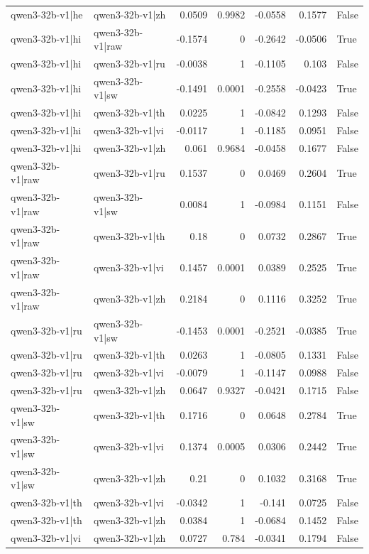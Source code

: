 \begin{table}
\begin{tabular}{l l r r r r l}
qwen3-32b-v1|he & qwen3-32b-v1|zh & 0.0509 & 0.9982 & -0.0558 & 0.1577 & False \\
qwen3-32b-v1|hi & qwen3-32b-v1|raw & -0.1574 & 0 & -0.2642 & -0.0506 & True \\
qwen3-32b-v1|hi & qwen3-32b-v1|ru & -0.0038 & 1 & -0.1105 & 0.103 & False \\
qwen3-32b-v1|hi & qwen3-32b-v1|sw & -0.1491 & 0.0001 & -0.2558 & -0.0423 & True \\
qwen3-32b-v1|hi & qwen3-32b-v1|th & 0.0225 & 1 & -0.0842 & 0.1293 & False \\
qwen3-32b-v1|hi & qwen3-32b-v1|vi & -0.0117 & 1 & -0.1185 & 0.0951 & False \\
qwen3-32b-v1|hi & qwen3-32b-v1|zh & 0.061 & 0.9684 & -0.0458 & 0.1677 & False \\
qwen3-32b-v1|raw & qwen3-32b-v1|ru & 0.1537 & 0 & 0.0469 & 0.2604 & True \\
qwen3-32b-v1|raw & qwen3-32b-v1|sw & 0.0084 & 1 & -0.0984 & 0.1151 & False \\
qwen3-32b-v1|raw & qwen3-32b-v1|th & 0.18 & 0 & 0.0732 & 0.2867 & True \\
qwen3-32b-v1|raw & qwen3-32b-v1|vi & 0.1457 & 0.0001 & 0.0389 & 0.2525 & True \\
qwen3-32b-v1|raw & qwen3-32b-v1|zh & 0.2184 & 0 & 0.1116 & 0.3252 & True \\
qwen3-32b-v1|ru & qwen3-32b-v1|sw & -0.1453 & 0.0001 & -0.2521 & -0.0385 & True \\
qwen3-32b-v1|ru & qwen3-32b-v1|th & 0.0263 & 1 & -0.0805 & 0.1331 & False \\
qwen3-32b-v1|ru & qwen3-32b-v1|vi & -0.0079 & 1 & -0.1147 & 0.0988 & False \\
qwen3-32b-v1|ru & qwen3-32b-v1|zh & 0.0647 & 0.9327 & -0.0421 & 0.1715 & False \\
qwen3-32b-v1|sw & qwen3-32b-v1|th & 0.1716 & 0 & 0.0648 & 0.2784 & True \\
qwen3-32b-v1|sw & qwen3-32b-v1|vi & 0.1374 & 0.0005 & 0.0306 & 0.2442 & True \\
qwen3-32b-v1|sw & qwen3-32b-v1|zh & 0.21 & 0 & 0.1032 & 0.3168 & True \\
qwen3-32b-v1|th & qwen3-32b-v1|vi & -0.0342 & 1 & -0.141 & 0.0725 & False \\
qwen3-32b-v1|th & qwen3-32b-v1|zh & 0.0384 & 1 & -0.0684 & 0.1452 & False \\
qwen3-32b-v1|vi & qwen3-32b-v1|zh & 0.0727 & 0.784 & -0.0341 & 0.1794 & False \\
\bottomrule
\end{tabular}
\end{table}
